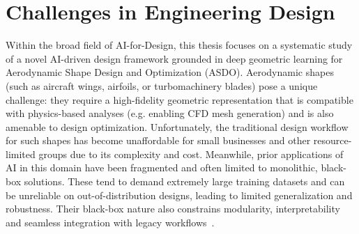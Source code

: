\section{Challenges in Engineering Design}
Within the broad field of AI-for-Design, this thesis focuses on a systematic study of a novel AI-driven design framework grounded in deep geometric learning for Aerodynamic Shape Design and Optimization (ASDO). Aerodynamic shapes (such as aircraft wings, airfoils, or turbomachinery blades) pose a unique challenge: they require a high-fidelity geometric representation that is compatible with physics-based analyses (e.g. enabling CFD mesh generation) and is also amenable to design optimization. Unfortunately, the traditional design workflow for such shapes has become unaffordable for small businesses and other resource-limited groups due to its complexity and cost. Meanwhile, prior applications of AI in this domain have been fragmented and often limited to monolithic, black-box solutions. These tend to demand extremely large training datasets and can be unreliable on out-of-distribution designs, leading to limited generalization and robustness. Their black-box nature also constrains modularity, interpretability and seamless integration with legacy workflows~\cite{aa.Lupp2025}.

